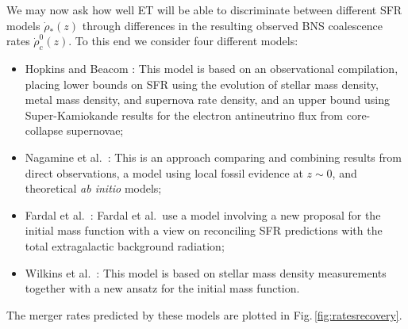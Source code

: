 We may now ask how well ET will be able to discriminate between 
different SFR models $\dot{\rho}_\ast(z)$ through differences in 
the resulting observed BNS coalescence rates $\dot{\rho}^0_c(z)$. To 
this end we consider four different models:
\begin{itemize}
\item Hopkins and Beacom \cite{sfr-HopkinsBeacom2006}: This model is 
based on an observational compilation, placing lower bounds on SFR using the 
evolution of stellar mass density, metal mass density, and supernova rate 
density, and an upper bound using Super-Kamiokande results for the 
electron antineutrino flux from core-collapse supernovae;
\item Nagamine et al.~\cite{Nagamineetal06}: This is an approach comparing and 
combining results from direct observations, a model using local fossil 
evidence at $z \sim 0$, and theoretical \emph{ab initio} models;
\item Fardal et al.~\cite{Fardaletal07}: Fardal et al.\, use a model 
involving a new proposal for the initial mass function with a view 
on reconciling SFR predictions with the total extragalactic background 
radiation;
\item Wilkins et al.~\cite{Wilkinsetal08}: This model is based on 
stellar mass density measurements together with a new ansatz for the 
initial mass function.
\end{itemize}
The merger rates predicted by these models are plotted in Fig.\,\ref{fig:ratesrecovery}.

